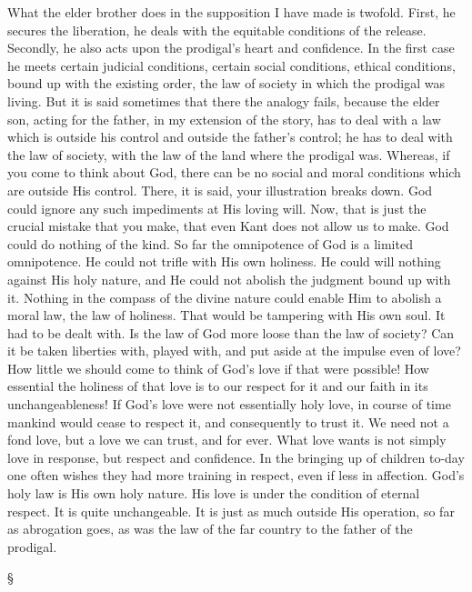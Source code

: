 \documentclass[12pt,a5paper,twoside,titlepage]{book}
\begin{document}
What the elder brother does in the supposition
I have made is twofold. First, he secures 
the liberation, he deals with the equitable conditions 
of the release. Secondly, he also acts upon 
the prodigal's heart and confidence. In the first 
case he meets certain judicial conditions, certain 
social conditions, ethical conditions, bound 
up with the existing order, the law of society 
in which the prodigal was living. But it is 
said sometimes that there the analogy fails, 
because the elder son, acting for the father, 
in my extension of the story, has to deal with 
a law which is outside his control and outside 
the father's control; he has to deal with the 
law of society, with the law of the land where 
the prodigal was. Whereas, if you come to 
think about God, there can be no social and 
moral conditions which are outside His control. 
There, it is said, your illustration breaks down. 
God could ignore any such impediments at 
His loving will. Now, that is just the crucial 
mistake that you make, that even Kant does 
not allow us to make. God could do nothing 
of the kind. So far the omnipotence of God is 
a limited omnipotence. He could not trifle with 
His own holiness. He could will nothing against 
His holy nature, and He could not abolish the 
judgment bound up with it. Nothing in the 
compass of the divine nature could enable Him 
to abolish a moral law, the law of holiness. That 
would be tampering with His own soul. It had 
to be dealt with. Is the law of God more loose 
than the law of society? Can it be taken liberties 
with, played with, and put aside at the 
impulse even of love? How little we should 
come to think of God's love if that were possible! 
How essential the holiness of that love is to 
our respect for it and our faith in its unchangeableness! 
If God's love were not essentially 
holy love, in course of time mankind would 
cease to respect it, and consequently to trust 
it. We need not a fond love, but a love we 
can trust, and for ever. What love wants is not 
simply love in response, but respect and confidence. 
In the bringing up of children to-day 
one often wishes they had more training in 
respect, even if less in affection. God's holy 
law is His own holy nature. His love is under 
the condition of eternal respect. It is quite 
unchangeable. It is just as much outside His 
operation, so far as abrogation goes, as was 
the law of the far country to the father of 
the prodigal. 

\begin{center}
\S
\end{center}
\end{document}
